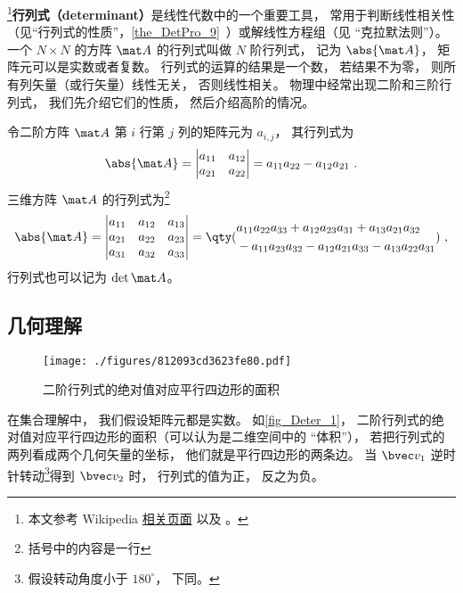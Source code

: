 

\footnote{本文参考 Wikipedia \href{https://en.wikipedia.org/wiki/Determinant}{相关页面} 以及 \cite{同济线}。}\textbf{行列式（determinant）}是线性代数中的一个重要工具， 常用于判断线性相关性（见“行列式的性质”，\autoref{the_DetPro_9}~）或解线性方程组（见 “克拉默法则”）。一个 $N\times N$ 的方阵 $\mat A$ 的行列式叫做 $N$ 阶行列式， 记为 $\abs{\mat A}$， 矩阵元可以是实数或者复数。 行列式的运算的结果是一个数， 若结果不为零， 则所有列矢量（或行矢量）线性无关， 否则线性相关。 物理中经常出现二阶和三阶行列式， 我们先介绍它们的性质， 然后介绍高阶的情况。

令二阶方阵 $\mat A$ 第 $i$ 行第 $j$ 列的矩阵元为 $a_{i,j}$， 其行列式为
\begin{equation}\label{eq_Deter_1}
\abs{\mat A} =
\begin{vmatrix}
a_{11} & a_{12} \\
a_{21} & a_{22}
\end{vmatrix} = a_{11}a_{22} - a_{12}a_{21}~.
\end{equation}
三维方阵 $\mat A$ 的行列式为\footnote{括号中的内容是一行}
\begin{equation}\label{eq_Deter_2}
\abs{\mat A} = 
\begin{vmatrix}
a_{11} & a_{12} & a_{13} \\
a_{21} & a_{22} & a_{23} \\
a_{31} & a_{32} & a_{33}
\end{vmatrix}
=
\qty(
\begin{aligned}
&a_{11}a_{22}a_{33} + a_{12}a_{23}a_{31} + a_{13}a_{21}a_{32} \\
&- a_{11}a_{23}a_{32} - a_{12}a_{21}a_{33} - a_{13}a_{22}a_{31}
\end{aligned}
)~,
\end{equation}
行列式也可以记为 $\det{\mat A}$。

\subsection{几何理解}

\begin{figure}[ht]
\centering
\texttt{[image: ./figures/812093cd3623fe80.pdf]}
\caption{二阶行列式的绝对值对应平行四边形的面积} \label{fig_Deter_1}
\end{figure}
在集合理解中， 我们假设矩阵元都是实数。 如\autoref{fig_Deter_1}， 二阶行列式的绝对值对应平行四边形的面积（可以认为是二维空间中的 “体积”）， 若把行列式的两列看成两个几何矢量的坐标， 他们就是平行四边形的两条边。 当 $\bvec v_1$ 逆时针转动\footnote{假设转动角度小于 $180^\circ$， 下同。}得到 $\bvec v_2$ 时， 行列式的值为正， 反之为负。

